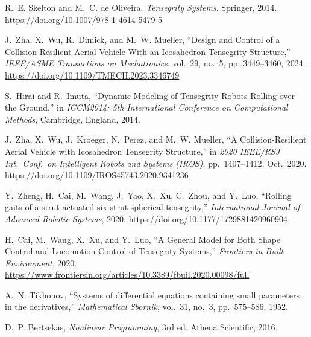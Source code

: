 \documentclass[12pt,letterpaper]{article}
\begin{document}
\begin{thebibliography}{99}

R.~E. Skelton and M.~C. de Oliveira,
\textit{Tensegrity Systems}.
Springer, 2014.
\url{https://doi.org/10.1007/978-1-4614-5479-5}

J.~Zha, X.~Wu, R.~Dimick, and M.~W. Mueller, 
``Design and Control of a Collision-Resilient Aerial Vehicle With an Icosahedron Tensegrity Structure,''
\textit{IEEE/ASME Transactions on Mechatronics}, vol.~29, no.~5, pp. 3449--3460, 2024.
\url{https://doi.org/10.1109/TMECH.2023.3346749}

S.~Hirai and R.~Imuta,
``Dynamic Modeling of Tensegrity Robots Rolling over the Ground,''
in \textit{ICCM2014: 5th International Conference on Computational Methods}, Cambridge, England, 2014.

J.~Zha, X.~Wu, J.~Kroeger, N.~Perez, and M.~W. Mueller,
``A Collision-Resilient Aerial Vehicle with Icosahedron Tensegrity Structure,''
in \textit{2020 IEEE/RSJ Int.\ Conf.\ on Intelligent Robots and Systems (IROS)},
pp.~1407--1412, Oct.\ 2020.
\url{https://doi.org/10.1109/IROS45743.2020.9341236}

Y.~Zheng, H.~Cai, M.~Wang, J.~Yao, X.~Xu, C.~Zhou, and Y.~Luo,
``Rolling gaits of a strut-actuated six-strut spherical tensegrity,''
\textit{International Journal of Advanced Robotic Systems}, 2020.
\url{https://doi.org/10.1177/1729881420960904}

H.~Cai, M.~Wang, X.~Xu, and Y.~Luo,
``A General Model for Both Shape Control and Locomotion Control of Tensegrity Systems,''
\textit{Frontiers in Built Environment}, 2020.
\url{https://www.frontiersin.org/articles/10.3389/fbuil.2020.00098/full}

A.~N. Tikhonov,
``Systems of differential equations containing small parameters in the derivatives,''
\textit{Mathematical Sbornik}, vol.~31, no.~3, pp.~575–586, 1952.

D.~P. Bertsekas,
\textit{Nonlinear Programming}, 3rd ed.
Athena Scientific, 2016.

\end{thebibliography}

\thispagestyle{ack_footer}
\end{document}
